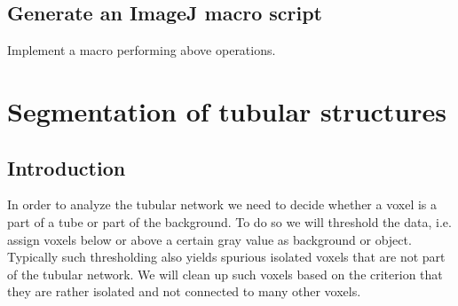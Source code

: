 \subsection{Generate an ImageJ macro script}
Implement a macro performing above operations.
%


%
\section{Segmentation of tubular structures}
%
\subsection{Introduction}
In order to analyze the tubular network we need to decide whether a voxel is a part of a tube or part of the background. To do so we will threshold the data, i.e. assign voxels below or above a certain gray value as background or object. Typically such thresholding also yields spurious isolated voxels that are not part of the tubular network. We will clean up such voxels based on the criterion that they are rather isolated and not connected to many other voxels.
%
